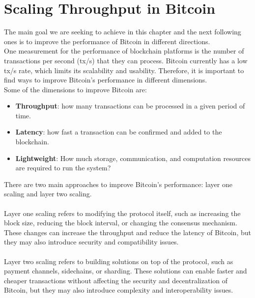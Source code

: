 \chapter{Scaling Throughput in Bitcoin}
The main goal we are seeking to achieve in this chapter and the next following ones is to improve the performance of Bitcoin in different directions. \\
One measurement for the performance of blockchain platforms is the number of transactions per second (tx/s) that they can process. Bitcoin currently has a low tx/s rate, which limits its scalability and usability. Therefore, it is important to find ways to improve Bitcoin’s performance in different dimensions.\\
Some of the dimensions to improve Bitcoin are:
\begin{itemize}
    \item \textbf{Throughput}: how many transactions can be processed in a given period of time.
    \item \textbf{Latency}: how fast a transaction can be confirmed and added to the blockchain.
    \item \textbf{Lightweight}: How much storage, communication, and computation resources are required to run the system?
\end{itemize}
There are two main approaches to improve Bitcoin’s performance: layer one scaling and layer two scaling.\\\\
Layer one scaling refers to modifying the protocol itself, such as increasing the block size, reducing the block interval, or changing the consensus mechanism. These changes can increase the throughput and reduce the latency of Bitcoin, but they may also introduce security and compatibility issues.\\\\
Layer two scaling refers to building solutions on top of the protocol, such as payment channels, sidechains, or sharding. These solutions can enable faster and cheaper transactions without affecting the security and decentralization of Bitcoin, but they may also introduce complexity and interoperability issues.

